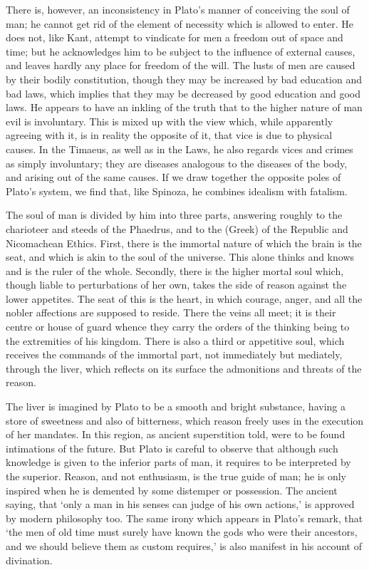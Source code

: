 \documentclass[11pt,letter]{article}
\begin{document}
\par  There is, however, an inconsistency in Plato’s manner of conceiving the soul of man; he cannot get rid of the element of necessity which is allowed to enter. He does not, like Kant, attempt to vindicate for men a freedom out of space and time; but he acknowledges him to be subject to the influence of external causes, and leaves hardly any place for freedom of the will. The lusts of men are caused by their bodily constitution, though they may be increased by bad education and bad laws, which implies that they may be decreased by good education and good laws. He appears to have an inkling of the truth that to the higher nature of man evil is involuntary. This is mixed up with the view which, while apparently agreeing with it, is in reality the opposite of it, that vice is due to physical causes. In the Timaeus, as well as in the Laws, he also regards vices and crimes as simply involuntary; they are diseases analogous to the diseases of the body, and arising out of the same causes. If we draw together the opposite poles of Plato’s system, we find that, like Spinoza, he combines idealism with fatalism.

\par  The soul of man is divided by him into three parts, answering roughly to the charioteer and steeds of the Phaedrus, and to the (Greek) of the Republic and Nicomachean Ethics. First, there is the immortal nature of which the brain is the seat, and which is akin to the soul of the universe. This alone thinks and knows and is the ruler of the whole. Secondly, there is the higher mortal soul which, though liable to perturbations of her own, takes the side of reason against the lower appetites. The seat of this is the heart, in which courage, anger, and all the nobler affections are supposed to reside. There the veins all meet; it is their centre or house of guard whence they carry the orders of the thinking being to the extremities of his kingdom. There is also a third or appetitive soul, which receives the commands of the immortal part, not immediately but mediately, through the liver, which reflects on its surface the admonitions and threats of the reason.

\par  The liver is imagined by Plato to be a smooth and bright substance, having a store of sweetness and also of bitterness, which reason freely uses in the execution of her mandates. In this region, as ancient superstition told, were to be found intimations of the future. But Plato is careful to observe that although such knowledge is given to the inferior parts of man, it requires to be interpreted by the superior. Reason, and not enthusiasm, is the true guide of man; he is only inspired when he is demented by some distemper or possession. The ancient saying, that ‘only a man in his senses can judge of his own actions,’ is approved by modern philosophy too. The same irony which appears in Plato’s remark, that ‘the men of old time must surely have known the gods who were their ancestors, and we should believe them as custom requires,’ is also manifest in his account of divination.
\end{document}
